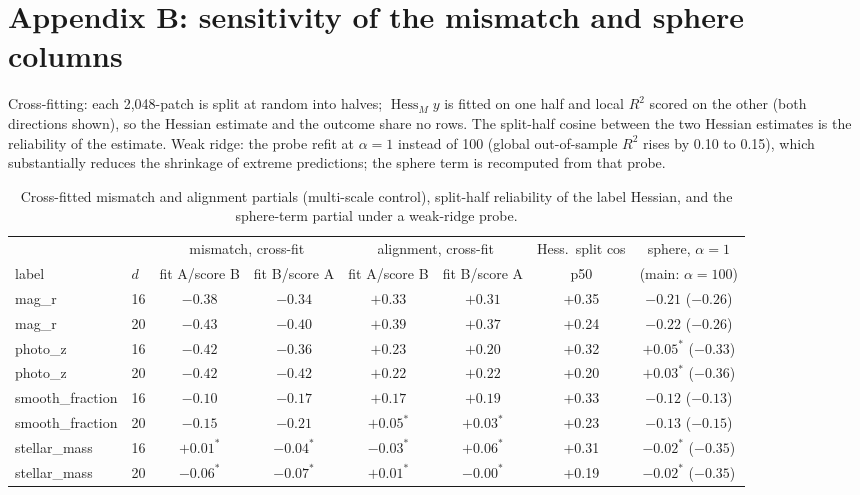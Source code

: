 \documentclass{article}
\begin{document}
\section*{Appendix B: sensitivity of the mismatch and sphere columns}
Cross-fitting: each 2{,}048-patch is split at random into halves; $\operatorname{Hess}_M y$ is fitted on one half and local $R^2$ scored on the other (both directions shown), so the Hessian estimate and the outcome share no rows. The split-half cosine between the two Hessian estimates is the reliability of the estimate. Weak ridge: the probe refit at $\alpha=1$ instead of 100 (global out-of-sample $R^2$ rises by 0.10 to 0.15), which substantially reduces the shrinkage of extreme predictions; the sphere term is recomputed from that probe.
\begin{table}[h]
\centering\footnotesize\setlength{\tabcolsep}{3.5pt}
\begin{tabular}{llcccccc}
\toprule
 & & \multicolumn{2}{c}{mismatch, cross-fit} & \multicolumn{2}{c}{alignment, cross-fit} & Hess.\ split cos & sphere, $\alpha=1$ \\
label & $d$ & fit A/score B & fit B/score A & fit A/score B & fit B/score A & p50 & (main: $\alpha=100$) \\
\midrule
mag\_r & 16 & $-0.38$ & $-0.34$ & $+0.33$ & $+0.31$ & +0.35 & $-0.21$ ($-0.26$) \\
mag\_r & 20 & $-0.43$ & $-0.40$ & $+0.39$ & $+0.37$ & +0.24 & $-0.22$ ($-0.26$) \\
photo\_z & 16 & $-0.42$ & $-0.36$ & $+0.23$ & $+0.20$ & +0.32 & $+0.05^{*}$ ($-0.33$) \\
photo\_z & 20 & $-0.42$ & $-0.42$ & $+0.22$ & $+0.22$ & +0.20 & $+0.03^{*}$ ($-0.36$) \\
smooth\_fraction & 16 & $-0.10$ & $-0.17$ & $+0.17$ & $+0.19$ & +0.33 & $-0.12$ ($-0.13$) \\
smooth\_fraction & 20 & $-0.15$ & $-0.21$ & $+0.05^{*}$ & $+0.03^{*}$ & +0.23 & $-0.13$ ($-0.15$) \\
stellar\_mass & 16 & $+0.01^{*}$ & $-0.04^{*}$ & $-0.03^{*}$ & $+0.06^{*}$ & +0.31 & $-0.02^{*}$ ($-0.35$) \\
stellar\_mass & 20 & $-0.06^{*}$ & $-0.07^{*}$ & $+0.01^{*}$ & $-0.00^{*}$ & +0.19 & $-0.02^{*}$ ($-0.35$) \\
\bottomrule
\end{tabular}
\caption{Cross-fitted mismatch and alignment partials (multi-scale control), split-half reliability of the label Hessian, and the sphere-term partial under a weak-ridge probe.}
\label{tab:sens}
\end{table}
\end{document}
